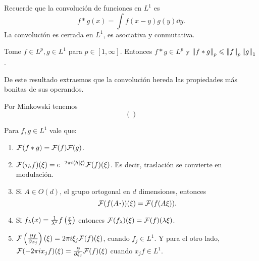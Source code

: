 \documentclass[12pt]{memoir}
\begin{document}
Recuerde que la convolución de funciones en $L^1$ es
$$f\ast g(x)=\int f(x-y)g(y)\dd y.$$
La convolución es cerrada en $L^1$, es asociativa y conmutativa.

\begin{Th}
  Tome $f\in L^p, g\in L^1$ para $p\in [1,\infty]$. Entonces $f\ast g\in L^p$ y $\left\|f\ast g\right\|_p\leqslant\left\|f\right\|_p\left\|g\right\|_1$.
\end{Th}

De este resultado extraemos que la convolución hereda las propiedades más bonitas de sus operandos. 

\begin{ptcbp}
  Por Minkowski tenemos 
  $$\left(\right)$$
\end{ptcbp}

\begin{Prop}\label{prop:PropiedadesTransformada}
  Para $f,g\in L^1$ vale que:
  \begin{enumerate}
    \item $\mathcal{F}(f\ast g)=\mathcal{F}(f)\mathcal{F}(g)$.
    \item $\mathcal{F}(\tau_h f)(\xi)=e^{-2\pi i\braket{h}{\xi}}\mathcal{F}(f)(\xi)$. Es decir, traslación se convierte en modulación.
    \item Si $A\in O(d)$, el grupo ortogonal en $d$ dimensiones, entonces
    $$\cF(f(A\.))(\xi)=\cF(f(A\xi)).$$
    \item Si $f_\lambda(x)=\frac{1}{\lambda^d}f\left(\frac{x}{\lambda}\right)$ entonces $\mathcal{F}(f_\lambda)(\xi)=\mathcal{F}(f)(\lambda\xi)$.
    \item $\mathcal{F}\left(\pdv{f}{x_j}\right)(\xi)=2\pi i\xi_j\mathcal{F}(f)(\xi)$, cuando $f_j\in L^1$. Y para el otro lado, $\mathcal{F}(-2\pi ix_j f)(\xi)=\pdv{\xi_j}\mathcal{F}(f)(\xi)$ cuando $x_jf\in L^1$.
  \end{enumerate}
\end{Prop}
\end{document}
